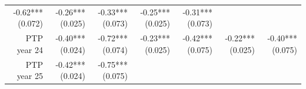 \documentclass[]{article}
\begin{document}
\begin{longtable}[c]{@{}rrrrrrr@{}}
\begin{minipage}[t]{0.12\columnwidth}
-0.62*** (0.072)
\strut\end{minipage} &
\begin{minipage}[t]{0.11\columnwidth}\raggedleft\strut
-0.26*** (0.025)
\strut\end{minipage} &
\begin{minipage}[t]{0.12\columnwidth}\raggedleft\strut
-0.33*** (0.073)
\strut\end{minipage} &
\begin{minipage}[t]{0.11\columnwidth}\raggedleft\strut
-0.25*** (0.025)
\strut\end{minipage} &
\begin{minipage}[t]{0.11\columnwidth}\raggedleft\strut
-0.31*** (0.073)
\strut\end{minipage}\tabularnewline
\begin{minipage}[t]{0.12\columnwidth}\raggedleft\strut
PTP year 24
\strut\end{minipage} &
\begin{minipage}[t]{0.11\columnwidth}\raggedleft\strut
-0.40*** (0.024)
\strut\end{minipage} &
\begin{minipage}[t]{0.12\columnwidth}\raggedleft\strut
-0.72*** (0.074)
\strut\end{minipage} &
\begin{minipage}[t]{0.11\columnwidth}\raggedleft\strut
-0.23*** (0.025)
\strut\end{minipage} &
\begin{minipage}[t]{0.12\columnwidth}\raggedleft\strut
-0.42*** (0.075)
\strut\end{minipage} &
\begin{minipage}[t]{0.11\columnwidth}\raggedleft\strut
-0.22*** (0.025)
\strut\end{minipage} &
\begin{minipage}[t]{0.11\columnwidth}\raggedleft\strut
-0.40*** (0.075)
\strut\end{minipage}\tabularnewline
\begin{minipage}[t]{0.12\columnwidth}\raggedleft\strut
PTP year 25
\strut\end{minipage} &
\begin{minipage}[t]{0.11\columnwidth}\raggedleft\strut
-0.42*** (0.024)
\strut\end{minipage} &
\begin{minipage}[t]{0.12\columnwidth}\raggedleft\strut
-0.75*** (0.075)
\strut\end{minipage} &
\begin{minipage}[t]{0.11\columnwidth}\raggedleft\strut

\end{minipage}
\end{longtable}
\end{document}
